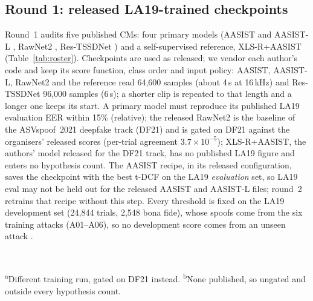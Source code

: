 \documentclass[review,authoryear]{elsarticle}
\newcommand{\tauE}{\tau^{*}_{\mathrm{EER}}}
\begin{document}
\subsection{Round 1: released LA19-trained checkpoints}
Round~1 audits five published CMs: four primary models (AASIST and AASIST-L \citep{jung22_aasist}, RawNet2
\citep{tak21_rawnet2}, Res-TSSDNet \citep{hua21_res_tssdnet}) and a self-supervised reference, XLS-R+AASIST
\citep{tak22_xlsr_aasist} (Table~\ref{tab:roster}). Checkpoints are used as released; we vendor each author's code and keep
its score function, class order and input policy: AASIST, AASIST-L, RawNet2 and the reference read 64,600 samples (about
4\,s at 16\,kHz) and Res-TSSDNet 96,000 samples (6\,s); a shorter clip is repeated to that length and a longer one keeps
its start. A primary model must reproduce its published LA19 evaluation EER within
15\% (relative); the released RawNet2 is the baseline of the ASVspoof~2021 deepfake track (DF21) and is gated on DF21
against the organisers' released scores (per-trial agreement \(3.7{\times}10^{-5}\)); XLS-R+AASIST, the authors' model
released for the DF21 track, has no published LA19 figure and enters no hypothesis count. The AASIST recipe, in its
released configuration, saves the checkpoint with the best t-DCF on the LA19 \emph{evaluation} set, so LA19 eval may not
be held out for the released AASIST and AASIST-L files; round~2 retrains that recipe without this step. Every threshold is fixed on the LA19 development set (24,844 trials, 2,548 bona fide),
whose spoofs come from the six training attacks (A01--A06), so no development score comes from an unseen attack
\citep{wang20_asvspoof2019}.

\begin{table}[!t]
\caption{Round-1 roster and development thresholds. EER on LA19 eval (\%): ours / published. Dev EER (\%) and \(\tauE\) on
LA19 dev. Last column: dev bona fide trials below, and dev spoof trials at or above, \(\tauE\).}
\label{tab:roster}
\centering
\footnotesize
\setlength{\tabcolsep}{3pt}
\\[2pt]
\parbox{\columnwidth}{\footnotesize\textsuperscript{a}Different training run, gated on DF21 instead.
\textsuperscript{b}None published, so ungated and outside every hypothesis count.}
\end{table}
\end{document}
